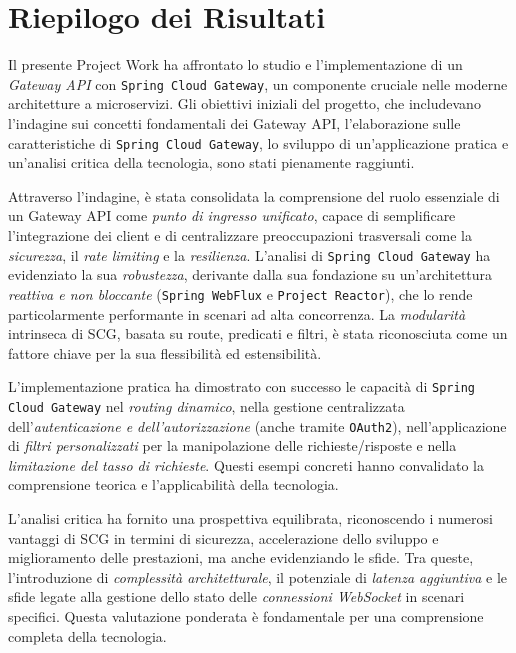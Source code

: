 \section{Riepilogo dei Risultati}

Il presente Project Work ha affrontato lo studio e l'implementazione di un \emph{Gateway API} con \texttt{Spring Cloud Gateway}, un componente cruciale nelle moderne architetture a microservizi. Gli obiettivi iniziali del progetto, che includevano l'indagine sui concetti fondamentali dei Gateway API, l'elaborazione sulle caratteristiche di \texttt{Spring Cloud Gateway}, lo sviluppo di un'applicazione pratica e un'analisi critica della tecnologia, sono stati pienamente raggiunti.

Attraverso l'indagine, è stata consolidata la comprensione del ruolo essenziale di un Gateway API come \emph{punto di ingresso unificato}, capace di semplificare l'integrazione dei client e di centralizzare preoccupazioni trasversali come la \emph{sicurezza}, il \emph{rate limiting} e la \emph{resilienza}. L'analisi di \texttt{Spring Cloud Gateway} ha evidenziato la sua \emph{robustezza}, derivante dalla sua fondazione su un'architettura \emph{reattiva e non bloccante} (\texttt{Spring WebFlux} e \texttt{Project Reactor}), che lo rende particolarmente performante in scenari ad alta concorrenza. La \emph{modularità} intrinseca di \textsc{SCG}, basata su route, predicati e filtri, è stata riconosciuta come un fattore chiave per la sua flessibilità ed estensibilità.

L'implementazione pratica ha dimostrato con successo le capacità di \texttt{Spring Cloud Gateway} nel \emph{routing dinamico}, nella gestione centralizzata dell'\emph{autenticazione e dell'autorizzazione} (anche tramite \texttt{OAuth2}), nell'applicazione di \emph{filtri personalizzati} per la manipolazione delle richieste/risposte e nella \emph{limitazione del tasso di richieste}. Questi esempi concreti hanno convalidato la comprensione teorica e l'applicabilità della tecnologia.

L'analisi critica ha fornito una prospettiva equilibrata, riconoscendo i numerosi vantaggi di \textsc{SCG} in termini di sicurezza, accelerazione dello sviluppo e miglioramento delle prestazioni, ma anche evidenziando le sfide. Tra queste, l'introduzione di \emph{complessità architetturale}, il potenziale di \emph{latenza aggiuntiva} e le sfide legate alla gestione dello stato delle \emph{connessioni WebSocket} in scenari specifici. Questa valutazione ponderata è fondamentale per una comprensione completa della tecnologia.

